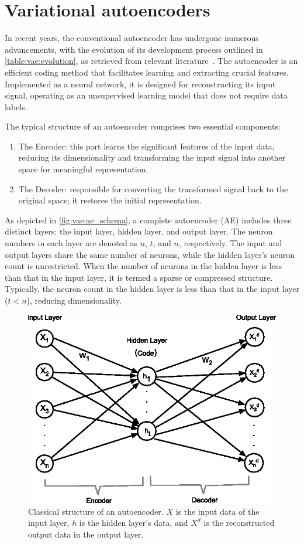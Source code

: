 \chapter{Variational autoencoders}
\label{ch:vae}

In recent years, the conventional autoencoder has undergone numerous advancements, with the evolution of its development process outlined in \autoref{table:vae:evolution}, as retrieved from relevant literature~\cite{li2023comprehensive}. The autoencoder is an efficient coding method that facilitates learning and extracting crucial features. Implemented as a neural network, it is designed for reconstructing its input signal, operating as an unsupervised learning model that does not require data labels.

The typical structure of an autoencoder comprises two essential components:
\begin{enumerate}
    \item The Encoder: this part learns the significant features of the input data, reducing its dimensionality and transforming the input signal into another space for meaningful representation.

    \item The Decoder: responsible for converting the transformed signal back to the original space; it restores the initial representation.
\end{enumerate}



As depicted in \autoref{fig:vae:ae_schema}, a complete autoencoder (AE) includes three distinct layers: the input layer, hidden layer, and output layer. The neuron numbers in each layer are denoted as $n$, $t$, and $n$, respectively. The input and output layers share the same number of neurons, while the hidden layer's neuron count is unrestricted. When the number of neurons in the hidden layer is less than that in the input layer, it is termed a sparse or compressed structure. Typically, the neuron count in the hidden layer is less than that in the input layer ($t < n$), reducing dimensionality.

\begin{figure}[htp]
\centering
\includegraphics[width=.75\textwidth]{chapters/utility/img/ae_schema.eps}
\caption{Classical structure of an autoencoder. $X$ is the input data of the input layer, $h$ is the hidden layer's data, and $X^d$ is the reconstructed output data in the output layer.}
\label{fig:vae:ae_schema}
\end{figure}

